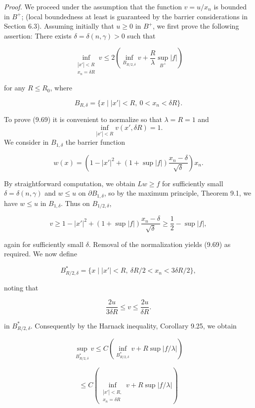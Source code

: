 \noindent\textit{Proof.} We proceed under the assumption that the function $v = u/x_n$ is bounded in $B^+$; (local boundedness at least is guaranteed by the barrier considerations in Section 6.3). Assuming initially that $u \geq 0$ in $B^+$, we first prove the following assertion: There exists $\delta = \delta(n,\gamma) > 0$ such that

\begin{equation}\tag{9.69}
\inf_{\substack{|x'|<R\\ x_n=\delta R}} v \leq 2\left(\inf_{B_{R/2,\delta}} v + \frac{R}{\lambda}\sup_{B^+}|f|\right)
\end{equation}

\noindent for any $R \leq R_0$, where

\[
B_{R,\delta}=\{x \mid |x'|<R,\ 0<x_n<\delta R\}.
\]

To prove (9.69) it is convenient to normalize so that $\lambda = R = 1$ and
\[
\inf_{|x'|<R} v(x',\delta R)=1.
\]
We consider in $B_{1,\delta}$ the barrier function

\[
w(x)=\left(1-|x'|^2 + (1+\sup|f|)\frac{x_n-\delta}{\sqrt{\delta}}\right)x_n.
\]

By straightforward computation, we obtain $Lw \geq f$ for sufficiently small $\delta = \delta(n,\gamma)$ and $w \leq u$ on $\partial B_{1,\delta}$, so by the maximum principle, Theorem 9.1, we have $w \leq u$ in $B_{1,\delta}$. Thus on $B_{1/2,\delta}$,

\[
v \geq 1 - |x'|^2 + (1+\sup|f|)\frac{x_n-\delta}{\sqrt{\delta}} \geq \frac{1}{2} - \sup|f|,
\]

again for sufficiently small $\delta$. Removal of the normalization yields (9.69) as required. We now define

\[
B^*_{R/2,\delta}=\{x \mid |x'|<R,\ \delta R/2 < x_n < 3\delta R/2\},
\]

noting that

\[
\frac{2u}{3\delta R}\leq v \leq \frac{2u}{\delta R}.
\]



in $B^*_{R/2,\delta}$. Consequently by the Harnack inequality, Corollary 9.25, we obtain

\begin{equation}
\tag{9.70}
\sup_{B^*_{R/2,\delta}} v \leq C\left(\inf_{B^*_{R/2,\delta}} v + R \sup |f/\lambda|\right)
\end{equation}

\[
\leq C\left(\inf_{\substack{|x'|<R,\\ x_n=\delta R}} v + R \sup |f/\lambda|\right)
\]


